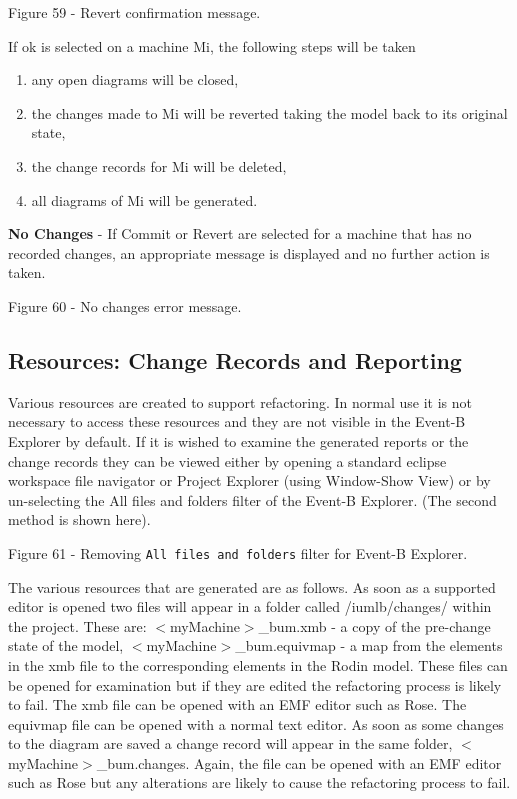 Figure 59 - Revert confirmation message.

If ok is selected on a machine Mi, the following steps will be taken
\begin{enumerate}
\item any open diagrams will be closed,
\item the changes made to Mi will be reverted taking the model back to its original state,
\item the change records for Mi will be deleted,
\item all diagrams of Mi will be generated.
\end{enumerate}


\textbf{No Changes} - 
If Commit or Revert are selected for a machine that has no recorded changes, an appropriate message is displayed and no further action is taken.

Figure 60 - No changes error message.


\subsection{Resources: Change Records and Reporting}

Various resources are created to support refactoring. In normal use it is not necessary to access these resources and they are not visible in the Event-B Explorer by default. If it is wished to examine the generated reports or the change records they can be viewed either by opening a standard eclipse workspace file navigator or Project Explorer (using Window-Show View) or by un-selecting the All files and folders filter of the Event-B Explorer. (The second method is shown here).

Figure 61 - Removing \texttt{All files and folders} filter for Event-B Explorer.

The various resources that are generated are as follows. 
As soon as a supported editor is opened two files will appear in a folder called /iumlb/changes/ within the project. These are:
$<$myMachine$>$\_bum.xmb  -  a copy of the pre-change state of the model,
$<$myMachine$>$\_bum.equivmap - a map from the elements in the xmb file to the corresponding elements in the Rodin  model. 
These files can be opened for examination but if they are edited the refactoring process is likely to fail. The xmb file can be opened with an EMF editor such as Rose. The equivmap file can be opened with a normal text editor.
As soon as some changes to the diagram are saved a change record will appear in the same folder, $<$myMachine$>$\_bum.changes.  Again, the file can be opened with an EMF editor such as Rose but any alterations are likely to cause the refactoring process to fail.


